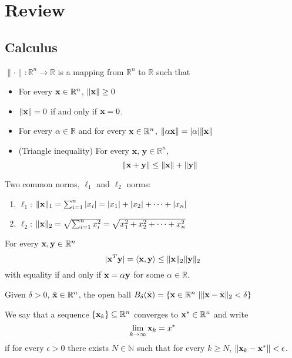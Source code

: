 \section{Review}
\subsection{Calculus}
\begin{definition}[Norm]
  $\| \cdot \|: \mathbb R^n \to \mathbb R$ is a mapping from $\mathbb R^n$ to $\mathbb R$ such that
  \begin{itemize}
    \item For every $\textbf{x} \in \mathbb R^n$, $\| \textbf{x} \| \geq 0$
    \item $\| \textbf{x} \| = 0$ if and only if $\textbf{x} = 0$.
    \item For every $\alpha \in \mathbb R$ and for every $\textbf{x} \in \mathbb R^n$, $\| \alpha \textbf{x} \| = |\alpha| \| \textbf{x} \|$
    \item (Triangle inequality) For every $\textbf{x, y} \in \mathbb R^n$, $$\| \textbf{x} + \textbf{y} \| \leq \| \textbf{x} \| + \| \textbf{y} \|$$
  \end{itemize}
  Two common norms, $\ell_1$ and $\ell_2$ norms:
  \begin{enumerate}
    \item $\ell_1$: $\| \textbf{x} \|_1 = \sum_{i=1}^n |x_i| = |x_1| + |x_2| + \cdots + |x_n|$
    \item $\ell_2$: $\| \textbf{x} \|_2 = \sqrt{\sum_{i=1}^n x_i^2} = \sqrt{x_1^2 + x_2^2 + \cdots + x_n^2}$
  \end{enumerate}
\end{definition}
\begin{proposition}
  For every $\textbf{x},\textbf{y} \in \mathbb R^n$
  $$|\textbf{x}^T \textbf{y}| = \langle \textbf{x}, \textbf{y} \rangle \leq \| \textbf{x} \|_2 \| \textbf{y} \|_2$$
  with equality if and only if $\textbf{x} = \alpha \textbf{y}$ for some $\alpha \in \mathbb R$.
\end{proposition}
\begin{definition}
  Given $\delta > 0$, $\bar{\textbf{x}}\in \mathbb{R}^n$, the open ball $B_{\delta}(\bar{\textbf{x}})=\{\textbf{x} \in \mathbb{R}^n\ | \|\textbf{x}-\bar{\textbf{x}}\|_2< \delta\}$
\end{definition}
\begin{definition}
  We say that a sequence $\{\textbf{x}_k\} \subseteq \mathbb R^n$ converges to $\textbf{x}^* \in \mathbb R^n$ and write $$\lim_{k \to \infty} \textbf{x}_k = x^*$$ if for every $\epsilon > 0$ there exists $N \in \mathbb N$ such that for every $k \geq N$, $\| \textbf{x}_k - \textbf{x}^* \| < \epsilon$.
\end{definition}
